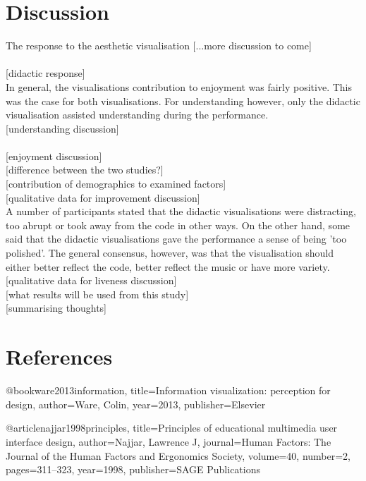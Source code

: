 \documentclass{article}
\begin{document}
\section{Discussion}

The response to the aesthetic visualisation [...more discussion to come]\\
[data indicates that aesthetic reduced early drop in enjoyment]\\

[didactic response]\\

In general, the visualisations contribution to enjoyment was fairly positive. This was the case for both visualisations. For understanding however, only the didactic visualisation assisted understanding during the performance.\\

[understanding discussion]\\
[understanding had the same pattern of understanding throughout the performance despite the starting differences]\\

[enjoyment discussion]\\

[difference between the two studies?]\\

[contribution of demographics to examined factors]\\

[qualitative data for improvement discussion]\\


A number of participants stated that the didactic visualisations were distracting, too abrupt or took away from the code in other ways. On the other hand, some said that the didactic visualisations gave the performance a sense of being 'too polished'. The general consensus, however, was that the visualisation should either better reflect the code, better reflect the music or have more variety.\\

[qualitative data for liveness discussion]\\

[what results will be used from this study]\\

[summarising thoughts]\\

\section{References}


@book{ware2013information,
  title={Information visualization: perception for design},
  author={Ware, Colin},
  year={2013},
  publisher={Elsevier}
}

@article{najjar1998principles,
  title={Principles of educational multimedia user interface design},
  author={Najjar, Lawrence J},
  journal={Human Factors: The Journal of the Human Factors and Ergonomics Society},
  volume={40},
  number={2},
  pages={311--323},
  year={1998},
  publisher={SAGE Publications}
}
\end{document}
